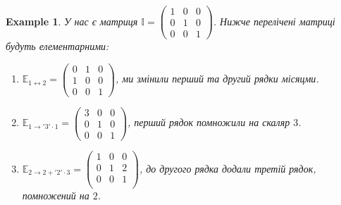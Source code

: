 \documentclass[a4paper, 10pt]{article}
\theoremstyle{theoremdd}
\newtheorem{example}[theorem]{Example}
\begin{document}
\begin{example}
	У нас є матриця $\mathbb{I} = \begin{pmatrix}
	1 & 0 & 0 \\
	0 & 1 & 0 \\
	0 & 0 & 1
	\end{pmatrix}$. Нижче перелічені матриці будуть елементарними:
	\begin{enumerate}[nosep,wide=0pt,label={\arabic*)}]
	\item $\mathbb{E}_{1 \leftrightarrow 2} = \begin{pmatrix}
	0 & 1 & 0 \\
	1 & 0 & 0 \\
	0 & 0 & 1 
	\end{pmatrix}$, ми змінили перший та другий рядки місяцми.
	\item $\mathbb{E}_{1 \rightarrow '3' \cdot 1} = \begin{pmatrix}
	3 & 0 & 0 \\
	0 & 1 & 0 \\
	0 & 0 & 1
	\end{pmatrix}$, перший рядок помножили на скаляр $3$.
	\item $\mathbb{E}_{2 \rightarrow 2 + '2'\cdot 3} = \begin{pmatrix}
	1 & 0 & 0 \\
	0 & 1 & 2 \\
	0 & 0 & 1 \\
	\end{pmatrix}$, до другого рядка додали третій рядок, помножений на $2$.
	\end{enumerate}
\end{example}
\end{document}
